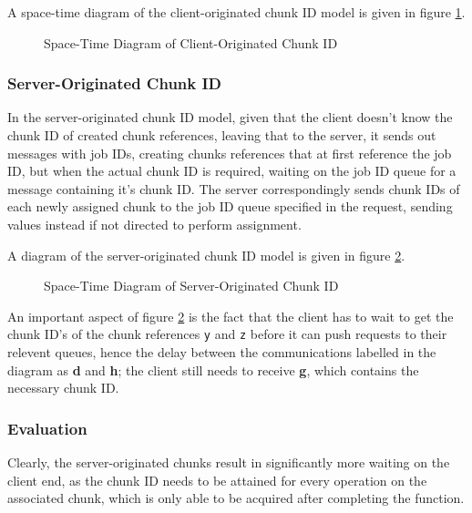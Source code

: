 A space-time diagram of the client-originated chunk ID model is given in figure
\cref{fig:mci}.

\begin{figure}
	
	\caption{\label{fig:mci} Space-Time Diagram of Client-Originated Chunk ID}
\end{figure}

\subsubsection{Server-Originated Chunk ID}

In the server-originated chunk ID model, given that the client doesn't know the
chunk ID of created chunk references, leaving that to the server, it sends out
messages with job IDs, creating chunks references that at first reference the
job ID, but when the actual chunk ID is required, waiting on the job ID queue
for a message containing it's chunk ID.
The server correspondingly sends chunk IDs of each newly assigned chunk to the
job ID queue specified in the request, sending values instead if not directed
to perform assignment.

A diagram of the server-originated chunk ID model is given in figure \cref{fig:msi}.

\setlength{\columnsep}{50pt}
\begin{figure}
	\centering
	
	\caption{\label{fig:msi} Space-Time Diagram of Server-Originated Chunk ID}
\end{figure}

An important aspect of figure \cref{fig:msi} is the fact that the client has to
wait to get the chunk ID's of the chunk references \texttt{y} and \texttt{z}
before it can push requests to their relevent queues, hence the delay between
the communications labelled in the diagram as \textcolor{dark2-3}{\textbf{d}}
and \textcolor{dark2-3}{\textbf{h}}; the client still needs to receive
\textcolor{dark2-1}{\textbf{g}}, which contains the necessary chunk ID.

\subsubsection{Evaluation}\label{sec:mod-eval}

Clearly, the server-originated chunks result in significantly more waiting on
the client end, as the chunk ID needs to be attained for every operation on the
associated chunk, which is only able to be acquired after completing the
function.

